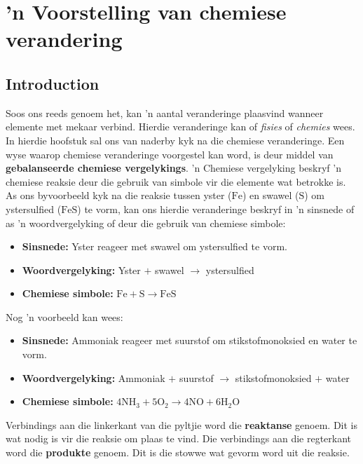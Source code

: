  \chapter{'n Voorstelling van chemiese verandering}
    \setcounter{figure}{1}
    \setcounter{subfigure}{1}
    \label{337cc49099d6e82169c54b5d0fc3878f}
         \section{Introduction}
    \nopagebreak

Soos ons reeds genoem het, kan 'n aantal veranderinge plaasvind wanneer elemente met mekaar verbind. Hierdie veranderinge kan of \textsl{fisies} of \textsl{chemies} wees. In hierdie hoofstuk sal ons van naderby kyk na die chemiese veranderinge. Een wyse waarop chemiese veranderinge voorgestel kan word, is deur middel van \textbf{gebalanseerde chemiese vergelykings}. 'n Chemiese vergelyking beskryf 'n chemiese reaksie deur die gebruik van simbole vir die elemente wat betrokke is. As ons byvoorbeeld kyk na die reaksie tussen yster ($\text{Fe}$) en swawel ($\text{S}$) om ystersulfied ($\text{FeS}$) te vorm, kan ons hierdie veranderinge beskryf in 'n sinsnede of as 'n woordvergelyking of deur die gebruik van chemiese simbole:
\begin{itemize}[noitemsep]
\item \textbf{Sinsnede:} Yster reageer met swawel om ystersulfied te vorm.
\item \textbf{Woordvergelyking:} Yster $+$ swawel $\to$ ystersulfied 
\item \textbf{Chemiese simbole:} $\text{Fe} + \text{S} \to \text{FeS}$
\end{itemize}
Nog 'n voorbeeld kan wees:
\begin{itemize}[noitemsep]
\item \textbf{Sinsnede:} Ammoniak reageer met suurstof om stikstofmonoksied en water te vorm.
\item \textbf{Woordvergelyking:} Ammoniak $+$ suurstof $\to$ stikstofmonoksied $+$ water
\item \textbf{Chemiese simbole:} $4{\text{NH}}_{3} + 5{\text{O}}_{2} \to 4\text{NO} + 6{\text{H}}_{2}\text{O}$
\end{itemize} 
Verbindings aan die linkerkant van die pyltjie word die \textbf{reaktanse} genoem. Dit is wat nodig is vir die
reaksie om plaas te vind. Die verbindings aan die regterkant word die \textbf{produkte} genoem. Dit is die stowwe wat gevorm word uit die reaksie.\par 
